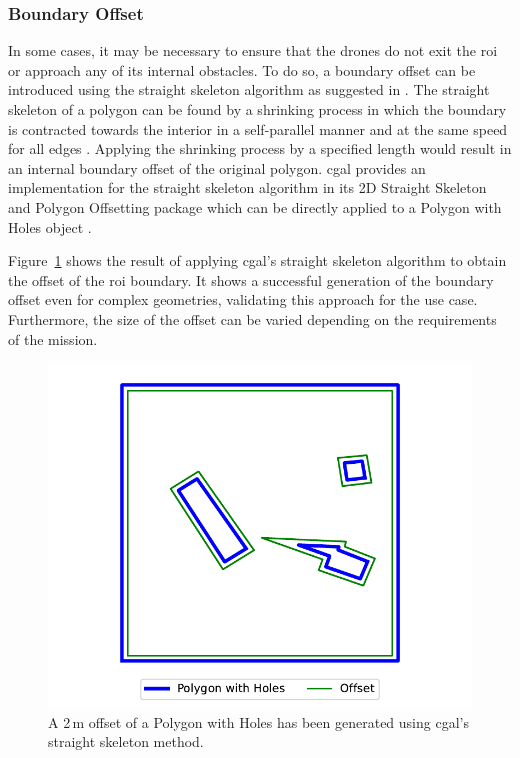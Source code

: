 
\subsubsection{Boundary Offset}

In some cases, it may be necessary to ensure that the drones do not exit the \gls{roi} or approach any of its internal obstacles. To do so, a boundary offset can be introduced using the straight skeleton algorithm as suggested in \cite{shahid2024cpp}. The straight skeleton of a polygon can be found by a shrinking process in which the boundary is contracted towards the interior in a self-parallel manner and at the same speed for all edges \cite{aichholzer1996ss}. Applying the shrinking process by a specified length would result in an internal boundary offset of the original polygon. \gls{cgal} provides an implementation for the straight skeleton algorithm in its 2D Straight Skeleton and Polygon Offsetting package which can be directly applied to a Polygon with Holes object \cite{cgal2024ss}.

Figure~\ref{fig:msp_straight_skeleton} shows the result of applying \gls{cgal}'s straight skeleton algorithm to obtain the offset of the \gls{roi} boundary. It shows a successful generation of the boundary offset even for complex geometries, validating this approach for the use case. Furthermore, the size of the offset can be varied depending on the requirements of the mission. 

\begin{figure}[h!]
    \centering
    \includegraphics[width=0.6\linewidth]{figs/Jihwan/Polygon Offset with Straight Skeleton.pdf}
    \caption[Offset of ROI using Straight Skeleton]
    {A 2\,m offset of a Polygon with Holes has been generated using \gls{cgal}'s straight skeleton method.}
    \label{fig:msp_straight_skeleton}
\end{figure}

